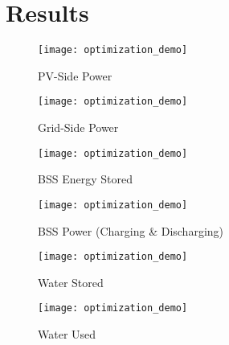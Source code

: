 \section{Results}
\label{sec:results}

\begin{figure}[hb]
	\centering
	\texttt{[image: optimization\_demo]}
	\caption{PV-Side Power}
	\label{fig:pv-side-power}
\end{figure}

\begin{figure}[hb]
	\centering
	\texttt{[image: optimization\_demo]}
	\caption{Grid-Side Power}
	\label{fig:grid-side-power}
\end{figure}

\begin{figure}[hb]
	\centering
	\texttt{[image: optimization\_demo]}
	\caption{BSS Energy Stored}
	\label{fig:bss-energy}
\end{figure}

\begin{figure}[hb]
	\centering
	\texttt{[image: optimization\_demo]}
	\caption{BSS Power (Charging \& Discharging)}
	\label{fig:bss-power}
\end{figure}

\begin{figure}[hb]
	\centering
	\texttt{[image: optimization\_demo]}
	\caption{Water Stored}
	\label{fig:water-level}
\end{figure}

\begin{figure}[hb]
	\centering
	\texttt{[image: optimization\_demo]}
	\caption{Water Used}
	\label{fig:water-used}
\end{figure}

